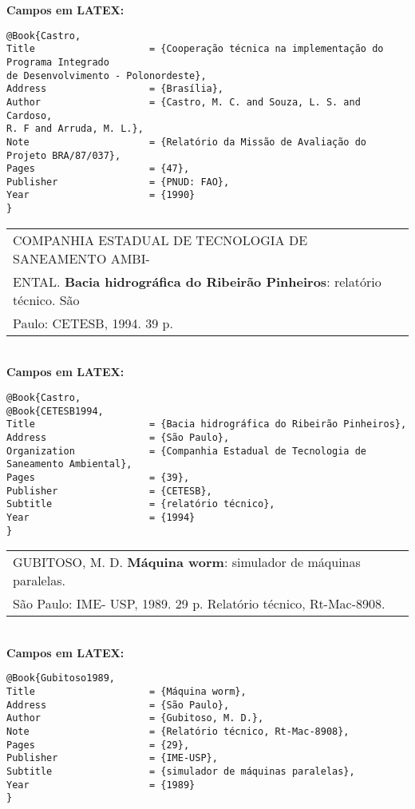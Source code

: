\textbf{Campos em LATEX:}
	
\begingroup
\fontsize{10pt}{12pt}\selectfont
\begin{verbatim}
@Book{Castro,
Title                    = {Cooperação técnica na implementação do 
Programa Integrado 
de Desenvolvimento - Polonordeste},
Address                  = {Brasília},
Author                   = {Castro, M. C. and Souza, L. S. and Cardoso, 
R. F and Arruda, M. L.},
Note                     = {Relatório da Missão de Avaliação do 
Projeto BRA/87/037},
Pages                    = {47},
Publisher                = {PNUD: FAO},
Year                     = {1990}
}
\end{verbatim}
\endgroup
	
\begin{tabular}{|l|c|} \hline
	COMPANHIA ESTADUAL DE TECNOLOGIA DE SANEAMENTO AMBI- \\ENTAL. \textbf{Bacia hidrográfica do Ribeirão Pinheiros}: relatório técnico. São \\Paulo: CETESB, 1994. 39 p.   \\\hline
\end{tabular}\\
	
\textbf{Campos em LATEX:}
	
\begingroup
\fontsize{10pt}{12pt}\selectfont
\begin{verbatim}
@Book{Castro,
@Book{CETESB1994,
Title                    = {Bacia hidrográfica do Ribeirão Pinheiros},
Address                  = {São Paulo},
Organization             = {Companhia Estadual de Tecnologia de 
Saneamento Ambiental},
Pages                    = {39},
Publisher                = {CETESB},
Subtitle                 = {relatório técnico},
Year                     = {1994}
}
\end{verbatim}
\endgroup
	
\begin{tabular}{|l|c|} \hline
	GUBITOSO, M. D. \textbf{Máquina worm}: simulador de máquinas paralelas. \\São Paulo: IME- USP, 1989. 29 p. Relatório técnico, Rt-Mac-8908.   \\\hline
\end{tabular}\\
	
\textbf{Campos em LATEX:}
	
\begingroup
\fontsize{10pt}{12pt}\selectfont
\begin{verbatim}
@Book{Gubitoso1989,
Title                    = {Máquina worm},
Address                  = {São Paulo},
Author                   = {Gubitoso, M. D.},
Note                     = {Relatório técnico, Rt-Mac-8908},
Pages                    = {29},
Publisher                = {IME-USP},
Subtitle                 = {simulador de máquinas paralelas},
Year                     = {1989}
}\end{verbatim}
\endgroup

